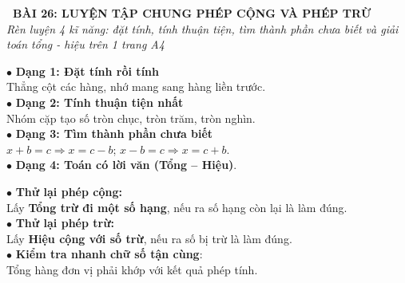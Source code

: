 \documentclass[14pt,a4paper,oneside]{extbook}
\begin{document}
\noindent
\begin{tcolorbox}[
  enhanced,
  colback=teal!8!white,
  colframe=teal!80!black,
  arc=3mm, boxrule=1pt,
  left=3mm, right=3mm, top=2mm, bottom=2mm,
  halign=center
]
  {\Large\bfseries\color{teal!90!black}\faBookmark\ BÀI 26: LUYỆN TẬP CHUNG PHÉP CỘNG VÀ PHÉP TRỪ}\\[1.5pt]
  {\footnotesize\itshape\color{black!75} Rèn luyện 4 kĩ năng: đặt tính, tính thuận tiện, tìm thành phần chưa biết và giải toán tổng - hiệu trên 1 trang A4}
\end{tcolorbox}

\vspace{2mm}

\noindent
\begin{minipage}[t]{0.49\textwidth}
  \begin{tcolorbox}[
    enhanced,
    title={\footnotesize\bfseries\color{white}\faListUl\ 1. Bốn dạng bài tập cốt lõi},
    colback=blue!2!white,
    colframe=blue!75!black,
    arc=2.5mm, boxrule=0.8pt, top=1.8mm, bottom=1.8mm, left=2mm, right=2mm
  ]
    \footnotesize
    $\bullet$ \textbf{Dạng 1: Đặt tính rồi tính}\\
    Thẳng cột các hàng, nhớ mang sang hàng liền trước.\\
    $\bullet$ \textbf{Dạng 2: Tính thuận tiện nhất}\\
    Nhóm cặp tạo số tròn chục, tròn trăm, tròn nghìn.\\
    $\bullet$ \textbf{Dạng 3: Tìm thành phần chưa biết}\\
    $x + b = c \Rightarrow x = c - b$; $x - b = c \Rightarrow x = c + b$.\\
    $\bullet$ \textbf{Dạng 4: Toán có lời văn (Tổng -- Hiệu)}.
  \end{tcolorbox}
\end{minipage}%
\hfill
\begin{minipage}[t]{0.49\textwidth}
  \begin{tcolorbox}[
    enhanced,
    title={\footnotesize\bfseries\color{white}\faCheck\ 2. Kĩ thuật thử lại chuẩn xác},
    colback=teal!2!white,
    colframe=teal!75!black,
    arc=2.5mm, boxrule=0.8pt, top=1.8mm, bottom=1.8mm, left=2mm, right=2mm
  ]
    \footnotesize
    $\bullet$ \textbf{Thử lại phép cộng:}\\
    Lấy \textbf{Tổng trừ đi một số hạng}, nếu ra số hạng còn lại là làm đúng.\\
    $\bullet$ \textbf{Thử lại phép trừ:}\\
    Lấy \textbf{Hiệu cộng với số trừ}, nếu ra số bị trừ là làm đúng.\\
    $\bullet$ \textbf{Kiểm tra nhanh chữ số tận cùng}:\\
    Tổng hàng đơn vị phải khớp với kết quả phép tính.
  \end{tcolorbox}
\end{minipage}
\end{document}
